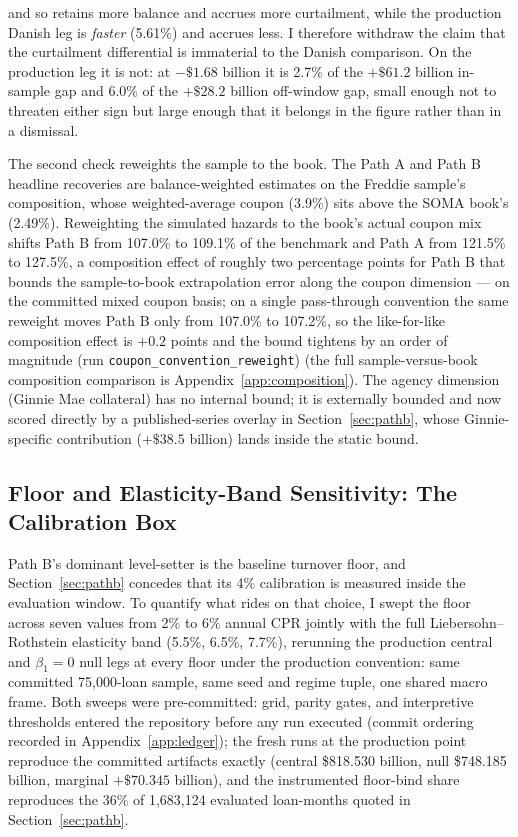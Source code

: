 \documentclass[12pt]{article}
\begin{document}
and so retains more balance and accrues more curtailment, while the production Danish leg is \emph{faster} (5.61\%) and accrues less. I therefore withdraw the claim that the curtailment differential is immaterial to the Danish comparison. On the production leg it is not: at $-\$1.68$ billion it is 2.7\% of the $+\$61.2$ billion in-sample gap and 6.0\% of the $+\$28.2$ billion off-window gap, small enough not to threaten either sign but large enough that it belongs in the figure rather than in a dismissal.

The second check reweights the sample to the book. The Path A and Path B headline recoveries are balance-weighted estimates on the Freddie sample's composition, whose weighted-average coupon (3.9\%) sits above the SOMA book's (2.49\%). Reweighting the simulated hazards to the book's actual coupon mix shifts Path B from 107.0\% to 109.1\% of the benchmark and Path A from 121.5\% to 127.5\%, a composition effect of roughly two percentage points for Path B that bounds the sample-to-book extrapolation error along the coupon dimension --- on the committed mixed coupon basis; on a single pass-through convention the same reweight moves Path B only from 107.0\% to 107.2\%, so the like-for-like composition effect is $+0.2$ points and the bound tightens by an order of magnitude (run \texttt{coupon\_convention\_reweight}) (the full sample-versus-book composition comparison is Appendix~\ref{app:composition}). The agency dimension (Ginnie Mae collateral) has no internal bound; it is externally bounded and now scored directly by a published-series overlay in Section~\ref{sec:pathb}, whose Ginnie-specific contribution ($+\$38.5$ billion) lands inside the static bound.

\subsection{Floor and Elasticity-Band Sensitivity: The Calibration Box}\label{sec:robustness-floor}

Path B's dominant level-setter is the baseline turnover floor, and Section~\ref{sec:pathb} concedes that its 4\% calibration is measured inside the evaluation window. To quantify what rides on that choice, I swept the floor across seven values from 2\% to 6\% annual CPR jointly with the full Liebersohn--Rothstein elasticity band (5.5\%, 6.5\%, 7.7\%), rerunning the production central and $\beta_1 = 0$ null legs at every floor under the production convention: same committed 75,000-loan sample, same seed and regime tuple, one shared macro frame. Both sweeps were pre-committed: grid, parity gates, and interpretive thresholds entered the repository before any run executed (commit ordering recorded in Appendix~\ref{app:ledger}); the fresh runs at the production point reproduce the committed artifacts exactly (central \$818.530 billion, null \$748.185 billion, marginal $+\$70.345$ billion), and the instrumented floor-bind share reproduces the 36\% of 1,683,124 evaluated loan-months quoted in Section~\ref{sec:pathb}.
\end{document}
